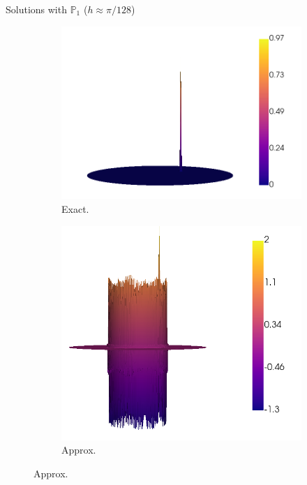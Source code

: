 	\begin{frame}{Solutions with $\mathbb{P}_1$ ($h\approx \pi/128$)}
		\begin{figure}[h!]
			\begin{subfigure}{0.49\textwidth}
				\centering
				\includegraphics[scale=0.2]{img/Conveccion_Reaccion/strong/conv_react_u_ex_nx-256.png}
				\caption{Exact.}
			\end{subfigure}
			\begin{subfigure}{0.49\textwidth}
				\centering
				\includegraphics[scale=0.2]{img/Conveccion_Reaccion/strong/conv_react_u_FE_nx-256.png}
				\caption{Approx.}
			\end{subfigure}
		\end{figure}
	\end{frame}

